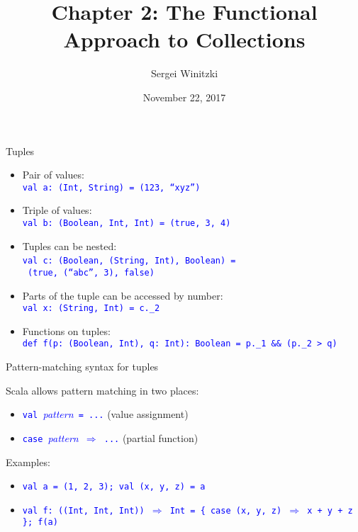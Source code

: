 \documentclass[english]{beamer}
\title[Chapter 2: Functional Collections]{Chapter 2: The Functional Approach to Collections}
\author{Sergei Winitzki}
\date{November 22, 2017}
\institute[ABTB]{Academy by the Bay}
\begin{document}
\frame{\titlepage}
\begin{frame}{Tuples}

\begin{itemize}
\item Pair of values: \texttt{\textcolor{blue}{\footnotesize{}}}~\\
\texttt{\textcolor{blue}{\footnotesize{}val a:\ (Int, String) = (123,
``xyz'')}}{\footnotesize\par}
\item Triple of values: \texttt{\textcolor{blue}{\footnotesize{}}}~\\
\texttt{\textcolor{blue}{\footnotesize{}val b:\ (Boolean, Int, Int)
= (true, 3, 4)}}{\footnotesize\par}
\item Tuples can be nested: \texttt{\textcolor{blue}{\footnotesize{}}}~\\
\texttt{\textcolor{blue}{\footnotesize{}val c:\ (Boolean, (String,
Int), Boolean) =}}~\\
\texttt{\textcolor{blue}{\footnotesize{} (true, (``abc'', 3), false)}}{\footnotesize\par}
\item Parts of the tuple can be accessed by number: \texttt{\textcolor{blue}{\footnotesize{}}}~\\
\texttt{\textcolor{blue}{\footnotesize{}val x:\ (String, Int) = c.\_2}}{\footnotesize\par}
\item Functions on tuples:\texttt{\textcolor{blue}{\footnotesize{}}}~\\
\texttt{\textcolor{blue}{\footnotesize{}def f(p:\ (Boolean, Int),
q:\ Int):\ Boolean = p.\_1 \&\& (p.\_2 > q) }}{\footnotesize\par}
\end{itemize}
\end{frame}

\begin{frame}{Pattern-matching syntax for tuples}

Scala allows pattern matching in two places:
\begin{itemize}
\item \texttt{\textcolor{blue}{\footnotesize{}val }}\textcolor{blue}{\emph{\footnotesize{}pattern}}\texttt{\textcolor{blue}{\footnotesize{}
= ...}} (value assignment)
\item \texttt{\textcolor{blue}{\footnotesize{}case }}\textcolor{blue}{\emph{\footnotesize{}pattern}}\texttt{\textcolor{blue}{\footnotesize{}
}}\textcolor{blue}{\footnotesize{}$\Rightarrow$}\texttt{\textcolor{blue}{\footnotesize{}
...}} (partial function)
\end{itemize}
Examples:
\begin{itemize}
\item \texttt{\textcolor{blue}{\footnotesize{}val a = (1, 2, 3); val (x,
y, z) = a}}{\footnotesize\par}
\item \texttt{\textcolor{blue}{\footnotesize{}val f:\ ((Int, Int, Int))
$\Rightarrow$ Int = \{ case (x, y, z) $\Rightarrow$ x + y + z \};
f(a)}}{\footnotesize\par}
\end{itemize}
\end{frame}
\end{document}

